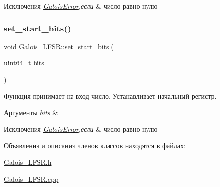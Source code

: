 \begin{DoxyExceptions}{Исключения}
{\em \hyperlink{classGaloisError}{Galois\+Error},если} & число равно нулю \\
\hline
\end{DoxyExceptions}
\mbox{\label{classGalois__LFSR_aa3a893992b929b01a649d859a121ae34}} 
\subsubsection{\texorpdfstring{set\+\_\+start\+\_\+bits()}{set\_start\_bits()}}
{\footnotesize\ttfamily void Galois\+\_\+\+L\+F\+S\+R\+::set\+\_\+start\+\_\+bits (\begin{DoxyParamCaption}\item[{uint64\+\_\+t}]{bits }\end{DoxyParamCaption})}



Функция принимает на вход число. Устанавливает начальный регистр. 


\begin{DoxyParams}{Аргументы}
{\em bits} & \\
\hline
\end{DoxyParams}

\begin{DoxyExceptions}{Исключения}
{\em \hyperlink{classGaloisError}{Galois\+Error},если} & число равно нулю \\
\hline
\end{DoxyExceptions}


Объявления и описания членов классов находятся в файлах\+:\begin{DoxyCompactItemize}
\item 
\hyperlink{Galois__LFSR_8h}{Galois\+\_\+\+L\+F\+S\+R.\+h}\item 
\hyperlink{Galois__LFSR_8cpp}{Galois\+\_\+\+L\+F\+S\+R.\+cpp}\end{DoxyCompactItemize}

